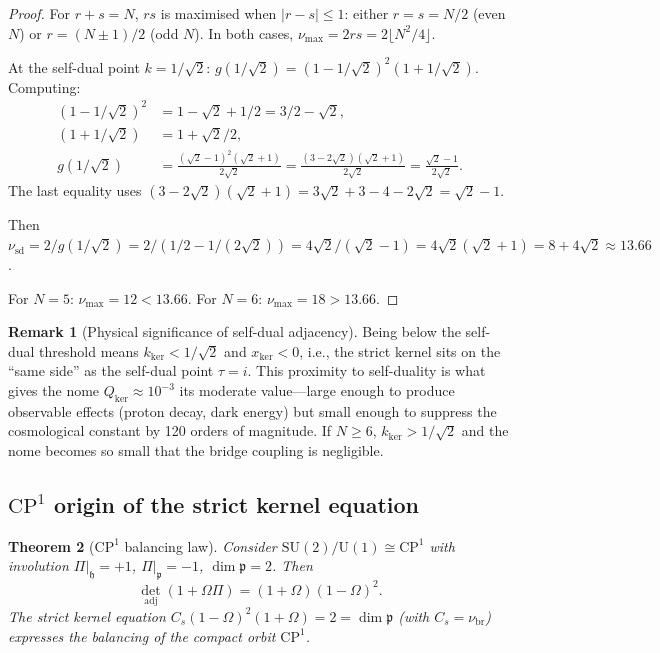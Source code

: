 \documentclass[12pt]{article}
\theoremstyle{plain}
\newtheorem{theorem}{Theorem}[section]
\theoremstyle{definition}
\newtheorem{remark}[theorem]{Remark}
\numberwithin{equation}{section}
\newcommand{\fh}{\mathfrak{h}}
\newcommand{\fp}{\mathfrak{p}}
\newcommand{\br}{\mathrm{br}}
\newcommand{\kker}{\mathrm{ker}}
\begin{document}
\begin{proof}
For $r+s=N$, $rs$ is maximised when $|r-s|\leq 1$: either $r=s=N/2$ (even $N$) or $r=(N\pm 1)/2$ (odd $N$).  In both cases, $\nu_{\max}=2rs=2\lfloor N^2/4\rfloor$.

At the self-dual point $k=1/\sqrt{2}$: $g(1/\sqrt{2})=(1-1/\sqrt{2})^2(1+1/\sqrt{2})$.  Computing:
\begin{align}
(1-1/\sqrt{2})^2 &= 1-\sqrt{2}+1/2 = 3/2-\sqrt{2},\\
(1+1/\sqrt{2}) &= 1+\sqrt{2}/2,\\
g(1/\sqrt{2}) &= \frac{(\sqrt{2}-1)^2(\sqrt{2}+1)}{2\sqrt{2}} = \frac{(3-2\sqrt{2})(\sqrt{2}+1)}{2\sqrt{2}} = \frac{\sqrt{2}-1}{2\sqrt{2}}.
\end{align}
The last equality uses $(3-2\sqrt{2})(\sqrt{2}+1)=3\sqrt{2}+3-4-2\sqrt{2}=\sqrt{2}-1$.

Then $\nu_{\mathrm{sd}}=2/g(1/\sqrt{2})=2/(1/2-1/(2\sqrt{2}))=4\sqrt{2}/(\sqrt{2}-1)=4\sqrt{2}(\sqrt{2}+1)=8+4\sqrt{2}\approx 13.66$.

For $N=5$: $\nu_{\max}=12<13.66$.  For $N=6$: $\nu_{\max}=18>13.66$.
\end{proof}

\begin{remark}[Physical significance of self-dual adjacency]
Being below the self-dual threshold means $k_{\kker}<1/\sqrt{2}$ and $x_{\kker}<0$, i.e., the strict kernel sits on the ``same side'' as the self-dual point $\tau=i$.  This proximity to self-duality is what gives the nome $Q_{\kker}\approx 10^{-3}$ its moderate value---large enough to produce observable effects (proton decay, dark energy) but small enough to suppress the cosmological constant by 120 orders of magnitude.  If $N\geq 6$, $k_{\kker}>1/\sqrt{2}$ and the nome becomes so small that the bridge coupling is negligible.
\end{remark}

\subsection{$\mathrm{CP}^1$ origin of the strict kernel equation}

\begin{theorem}[$\mathrm{CP}^1$ balancing law]\label{thm:CP1}
Consider $\mathrm{SU}(2)/\mathrm{U}(1)\cong\mathrm{CP}^1$ with involution $\Pi|_\fh=+1$, $\Pi|_\fp=-1$, $\dim\fp=2$.  Then
\begin{equation}
\det_{\mathrm{adj}}(1+\Omega\Pi) = (1+\Omega)(1-\Omega)^2.
\end{equation}
The strict kernel equation $C_s(1-\Omega)^2(1+\Omega)=2=\dim\fp$ (with $C_s=\nu_{\br}$) expresses the balancing of the compact orbit $\mathrm{CP}^1$.
\end{theorem}
\end{document}
